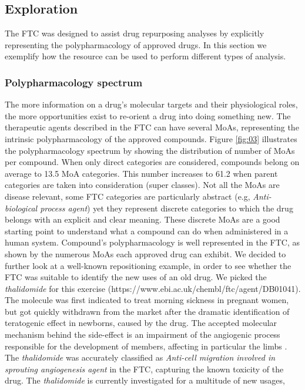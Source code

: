 \documentclass{bioinfo}
\begin{document}
\subsection{Exploration}\label{exploration}
The FTC was designed to assist drug repurposing analyses by explicitly representing the polypharmacology of 
approved drugs. In this section we exemplify how the resource can be used to perform different types of analysis.

\subsubsection{Polypharmacology spectrum}
The more information on a drug’s molecular targets and their physiological roles, the more opportunities 
exist to re-orient a drug into doing something new. The therapeutic agents described in the FTC can have several MoAs, 
representing the intrinsic polypharmacology of the approved compounds. Figure \ref{fig:03} illustrates the polypharmacology 
spectrum by showing the distribution of number of MoAs per compound. When only direct categories are considered, compounds belong on average
to 13.5 MoA categories. This number increases to 61.2 when parent categories are taken into consideration (super classes).
Not all the MoAs are disease relevant, 
some FTC categories are particularly abstract (e.g, \emph{Anti-biological process agent}) yet they represent discrete 
categories to which the drug belongs with an explicit and clear meaning. These discrete MoAs are a good starting 
point to understand what a compound can do when administered in a human system.
Compound's polypharmacology is 
well represented in the FTC, as shown by the numerous MoAs each approved drug can exhibit.
We decided to further look at a well-known repositioning example, 
in order to see whether the FTC was suitable to identify the new
uses of an old drug. We picked the \emph{thalidomide} for 
this exercise ({{https://www.ebi.ac.uk/chembl/ftc/agent/DB01041}}). The molecule was 
first indicated to treat morning sickness
in pregnant women, but got quickly withdrawn from the market after the dramatic identification 
of teratogenic effect in newborns, caused by the drug. The accepted molecular mechanism behind the side-effect is  
an impairment of the angiogenic process responsible for the development of members, affecting in particular the limbs \citep{therapontos2009thalidomide}.
The \emph{thalidomide} was accurately classified as \emph{Anti-cell migration involved in sprouting angiogenesis agent} in the FTC, capturing the known toxicity of the drug. The \emph{thalidomide} is currently investigated for a multitude of new usages,
\end{document}
